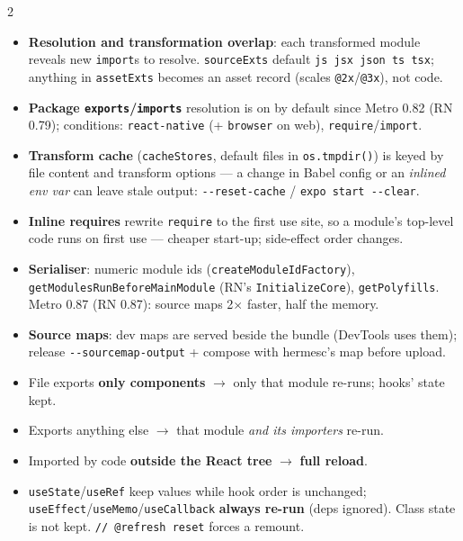 \documentclass[8pt]{extarticle}
\newcommand\ct[1]{\texttt{#1}}
\newcommand\dd{\hbox{-}\hbox{-}}
\newcommand\hd[1]{\par\vspace{3pt}\noindent{\bfseries\color{sheetBlue}#1}\par\vspace{1pt}}
\begin{document}
\begin{multicols}{2}
\raggedright{}

\hd{How it works}
\begin{itemize}
  \item \textbf{Resolution and transformation overlap}: each transformed module reveals new
        \ct{import}s to resolve. \ct{sourceExts} default \ct{js jsx json ts tsx}; anything in
        \ct{assetExts} becomes an asset record (scales \ct{@2x}/\ct{@3x}), not code.
  \item \textbf{Package \ct{exports}/\ct{imports}} resolution is on by default since Metro 0.82
        (RN 0.79); conditions: \ct{react-native} (+ \ct{browser} on web), \ct{require}/\ct{import}.
  \item \textbf{Transform cache} (\ct{cacheStores}, default files in \ct{os.tmpdir()}) is keyed by
        file content and transform options — a change in Babel config or an \emph{inlined env
        var} can leave stale output: \ct{\dd{}reset-cache} / \ct{expo start \dd{}clear}.
  \item \textbf{Inline requires} rewrite \ct{require} to the first use site, so a module's
        top-level code runs on first use — cheaper start-up; side-effect order changes.
  \item \textbf{Serialiser}: numeric module ids (\ct{createModuleIdFactory}),
        \ct{getModulesRunBeforeMainModule} (RN's \ct{InitializeCore}), \ct{getPolyfills}.
        Metro 0.87 (RN 0.87): source maps 2$\times$ faster, half the memory.
  \item \textbf{Source maps}: dev maps are served beside the bundle (DevTools uses them); release
        \ct{\dd{}sourcemap-output} + compose with hermesc's map before upload.
\end{itemize}

\hd{Fast Refresh — the rules}
\begin{itemize}
  \item File exports \textbf{only components} $\to$ only that module re-runs; hooks' state kept.
  \item Exports anything else $\to$ that module \emph{and its importers} re-run.
  \item Imported by code \textbf{outside the React tree} $\to$ \textbf{full reload}.
  \item \ct{useState}/\ct{useRef} keep values while hook order is unchanged;
        \ct{useEffect}/\ct{useMemo}/\ct{useCallback} \textbf{always re-run} (deps ignored).
        Class state is not kept. \ct{// @refresh reset} forces a remount.
\end{itemize}


\end{multicols}
\end{document}
